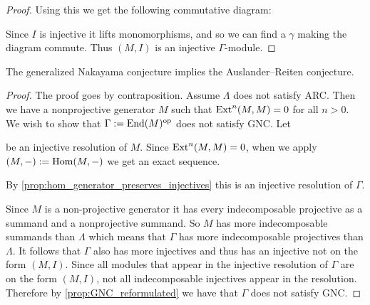 \begin{prop}
\begin{proof}
		Using this we get the following commutative diagram:
		\begin{center}
		\end{center}
		Since $I$ is injective it lifts monomorphisms, and so we can find a $\gamma$ making the diagram commute. Thus $(M, I)$ is an injective $\Gamma$-module.
	\end{proof}
\end{prop}

\begin{theorem}\label{thm:GNC_implies_ARC}
	The generalized Nakayama conjecture implies the Auslander--Reiten conjecture.
	\begin{proof}
		The proof goes by contraposition. Assume $\Lambda$ does not satisfy ARC. Then we have a nonprojective generator $M$ such that $\operatorname{Ext}^n(M, M)=0$ for all $n>0$. We wish to show that $\Gamma := \operatorname{End}(M)^{\operatorname{op}}$ does not satisfy GNC. Let
		\begin{center}
		\end{center}
		be an injective resolution of $M$. Since $\operatorname{Ext}^n(M,M)=0$, when we apply $(M,-):=\operatorname{Hom}(M,-)$ we get an exact sequence.
		\begin{center}
		\end{center}
		By \cref{prop:hom_generator_preserves_injectives} this is an injective resolution of $\Gamma$.
		
		Since $M$ is a non-projective generator it has every indecomposable projective as a summand and a nonprojective summand. So $M$ has more indecomposable summands than $\Lambda$ which means that $\Gamma$ has more indecomposable projectives than $\Lambda$. It follows that $\Gamma$ also has more injectives and thus has an injective not on the form $(M, I)$. Since all modules that appear in the injective resolution of $\Gamma$ are on the form $(M, I)$, not all indecomposable injectives appear in the resolution. Therefore by \cref{prop:GNC_reformulated} we have that $\Gamma$ does not satisfy GNC.
	\end{proof}
\end{theorem}

